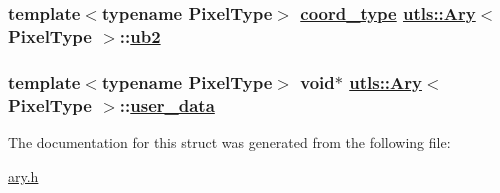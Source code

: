 \hypertarget{structutls_1_1Ary_c8672393bfae42004b996ca631755181}{
\subsubsection[ub2]{\setlength{\rightskip}{0pt plus 5cm}template$<$typename Pixel\-Type$>$ \hyperlink{structutls_1_1Ary_907420b899d180bd0ae87c3995316f18}{coord\_\-type} \hyperlink{structutls_1_1Ary}{utls::Ary}$<$ Pixel\-Type $>$::\hyperlink{structutls_1_1Ary_c8672393bfae42004b996ca631755181}{ub2}}}
\label{structutls_1_1Ary_c8672393bfae42004b996ca631755181}


\hypertarget{structutls_1_1Ary_7e91c5694fe2b59ce33d798551739ab8}{
\subsubsection[user\_\-data]{\setlength{\rightskip}{0pt plus 5cm}template$<$typename Pixel\-Type$>$ void$\ast$ \hyperlink{structutls_1_1Ary}{utls::Ary}$<$ Pixel\-Type $>$::\hyperlink{structutls_1_1Ary_7e91c5694fe2b59ce33d798551739ab8}{user\_\-data}}}
\label{structutls_1_1Ary_7e91c5694fe2b59ce33d798551739ab8}




The documentation for this struct was generated from the following file:\begin{CompactItemize}
\item 
\hyperlink{ary_8h}{ary.h}\end{CompactItemize}
